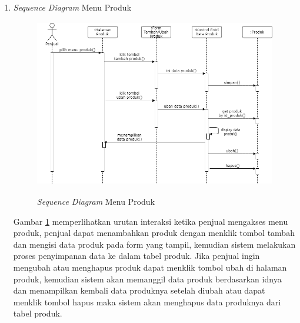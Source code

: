 \begin{enumerate}
	\item \textit{Sequence Diagram} Menu Produk
	\begin{figure}[H]
		\centering
		{\includegraphics [width = 12cm, height= 7.35cm]{gambar/sequence/tambah, ubah, hapus produk}}
		\caption{\textit{Sequence Diagram} Menu Produk}
		\label{seq produk}
	\end{figure}
	\par Gambar \ref*{seq produk} memperlihatkan urutan interaksi ketika penjual mengakses menu produk, penjual dapat menambahkan produk dengan menklik tombol tambah dan mengisi data produk pada form yang tampil, kemudian sistem melakukan proses penyimpanan data ke dalam tabel produk. Jika penjual ingin mengubah atau menghapus produk dapat menklik tombol ubah di halaman produk, kemudian sistem akan memanggil data produk berdasarkan idnya dan menampilkan kembali data produknya setelah diubah atau dapat menklik tombol hapus maka sistem akan menghapus data produknya dari tabel produk.


\end{enumerate}
